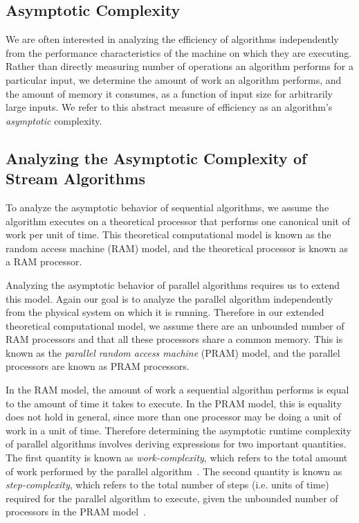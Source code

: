 \subsection{Asymptotic Complexity}

We are often interested in analyzing the efficiency of algorithms independently from the performance characteristics of the machine on which they are executing. Rather than directly measuring number of operations an algorithm performs for a particular input, we determine the amount of work an algorithm performs, and the amount of memory it consumes, as a function of input size for arbitrarily large inputs.
We refer to this abstract measure of efficiency as an algorithm's \emph{asymptotic} complexity.

\subsection{Analyzing the Asymptotic Complexity of Stream Algorithms}

To analyze the asymptotic behavior of sequential algorithms, we assume the algorithm executes on a theoretical processor that performs one canonical unit of work per unit of time. This theoretical computational model is known as the random access machine (RAM) model, and the theoretical processor is known as a RAM processor.~\cite{Atallah-1998}

Analyzing the asymptotic behavior of parallel algorithms requires us to extend this model. Again our goal is to analyze the parallel algorithm independently from the physical system on which it is running. Therefore in our extended theoretical computational model, we assume there are an unbounded number of RAM processors and that all these processors share a common memory. This is known as the \emph{\emph{parallel random access machine}} (PRAM) model, and the parallel processors are known as PRAM processors.~\cite{Atallah-1998}

In the RAM model, the amount of work a sequential algorithm performs is equal to the amount of time it takes to execute. In the PRAM model, this is equality does not hold in general, since more than one processor may be doing a unit of work in a unit of time. Therefore determining the asymptotic runtime complexity of parallel algorithms involves deriving expressions for two important quantities. The first quantity is known as \emph{work-complexity}, which refers to the total amount of work performed by the parallel algorithm~\cite{Atallah-1998}. The second quantity is known as \emph{step-complexity}, which refers to the total number of steps (i.e. units of time) required for the parallel algorithm to execute, given the unbounded number of processors in the PRAM model~\cite{Nyland-2000}.

